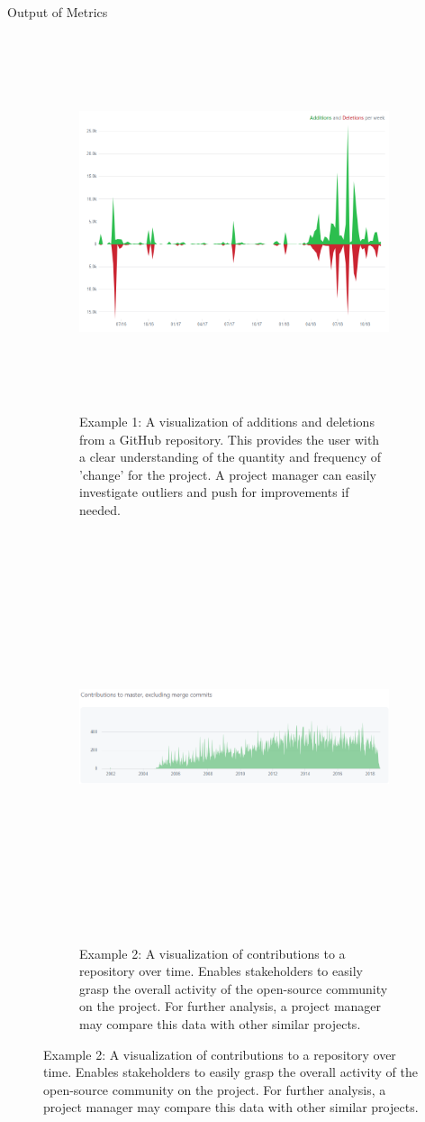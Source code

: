 \documentclass[22pt]{beamer}
\begin{document}
\begin{frame}[fragile]
\begin{textblock}{7.25}
\begin{block}{Output of Metrics}
\begin{figure}
  \begin{subfigure}{0.40\textwidth}
    \includegraphics[height=11cm]{AddDeleteVisual1.png}
        \caption*{Example 1: A visualization of additions and deletions from a GitHub repository. This provides the user with a clear understanding of the quantity and frequency of 'change' for the project. A project manager can easily investigate outliers and push for improvements if needed. }
  \end{subfigure}
  \begin{subfigure}{0.40\textwidth}
    \includegraphics[height=12cm, width = 18cm]{Contributions.png}
        \caption*{Example 2: A visualization of contributions to a repository over time. Enables stakeholders to easily grasp the overall activity of the open-source community on the project. For further analysis, a project manager may compare this data with other similar projects. }
    \end{subfigure}
 \end{figure}


\end{block}
\end{textblock}
\end{frame}
\end{document}
